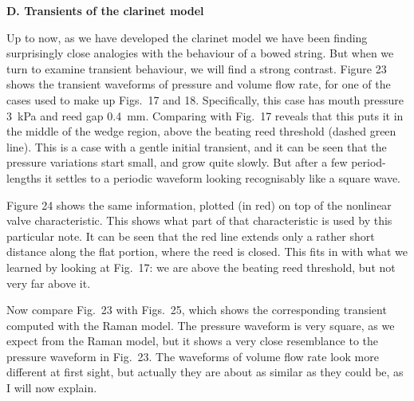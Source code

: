 

  \textbf{D. Transients of the clarinet model} 

  Up to now, as we have developed the clarinet model we have been finding 
  surprisingly close analogies with the behaviour of a bowed string. But when 
  we turn to examine transient behaviour, we will find a strong contrast. 
  Figure 23 shows the transient waveforms of pressure and volume flow rate, for 
  one of the cases used to make up Figs.\ 17 and 18. Specifically, this case 
  has mouth pressure 3~kPa and reed gap 0.4~mm. Comparing with Fig.\ 17 reveals 
  that this puts it in the middle of the wedge region, above the beating reed 
  threshold (dashed green line). This is a case with a gentle initial 
  transient, and it can be seen that the pressure variations start small, and 
  grow quite slowly. But after a few period-lengths it settles to a periodic 
  waveform looking recognisably like a square wave. 


  Figure 24 shows the same information, plotted (in red) on top of the 
  nonlinear valve characteristic. This shows what part of that characteristic 
  is used by this particular note. It can be seen that the red line extends 
  only a rather short distance along the flat portion, where the reed is 
  closed. This fits in with what we learned by looking at Fig.\ 17: we are 
  above the beating reed threshold, but not very far above it. 


  Now compare Fig.\ 23 with Figs.\ 25, which shows the corresponding transient 
  computed with the Raman model. The pressure waveform is very square, as we 
  expect from the Raman model, but it shows a very close resemblance to the 
  pressure waveform in Fig.\ 23. The waveforms of volume flow rate look more 
  different at first sight, but actually they are about as similar as they 
  could be, as I will now explain. 


